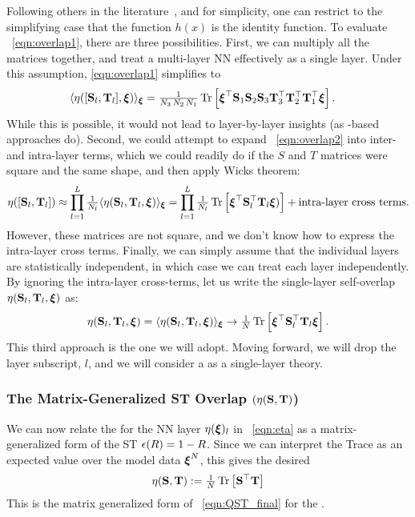 Following others in the literature~\cite{SMG2013_TR}, and for simplicity, one can restrict to the simplifying case that the function $h(x)$ is the identity function.
To evaluate \EQN~\ref{eqn:overlap1}, there are three possibilities.
First, we can multiply all the matrices together, and treat a multi-layer NN effectively as a single layer.
Under this assumption, \EQN \ref{eqn:overlap1} simplifies to
%
\begin{align}
\label{eqn:overlap2}
  \langle\eta([{\mathbf{S}}_l,{\mathbf{T}}_l],\boldsymbol{\xi})\rangle_{\boldsymbol{\xi}} &= \tfrac{1}{N_3 \, N_2 \, N_1} 
  \mbox{}\operatorname{Tr}\left[ \boldsymbol{\xi}^\top 
    \mathbf{S}_1 \mathbf{S}_2 \mathbf{S}_3 
    \mathbf{T}_3^{\top} \mathbf{T}_2^{\top} \mathbf{T}_1^{\top} 
    \boldsymbol{\xi} \right].
\end{align}
While this is possible, it would not lead to layer-by-layer insights (as \HTSR-based approaches do).
%
Second, we could attempt to expand \EQN~\ref{eqn:overlap2} into inter- and intra-layer terms, 
which we could readily do if the $S$ and $T$ matrices were square and the same shape, and then apply Wicks theorem:
\begin{align}
\eta([{\mathbf{S}}_l,{\mathbf{T}}_l])\approx\prod_{l=1}^{L}\tfrac{1}{N_l}\langle\eta({\mathbf{S}}_l,{\mathbf{T}}_l,\boldsymbol{\xi})\rangle_{\boldsymbol{\xi}}=\prod_{l=1}^{L}\tfrac{1}{N_l}\mbox{}\operatorname{Tr}\left[ \boldsymbol{\xi}^{\top} \mathbf{S}^{\top}_{l} \mathbf{T}_{l} \boldsymbol{\xi}) \right] +\text{intra-layer cross terms}.
\end{align}
However, these matrices are not square, and we don't know how to express the intra-layer cross terms.
%
Finally, we can simply assume that the individual layers are statistically independent, in which case we can treat each layer independently.
By ignoring the intra-layer cross-terms, let us write the single-layer self-overlap $\eta({\mathbf{S}}_l,{\mathbf{T}}_l,\boldsymbol{\xi})$ as:
\begin{align}
  \label{eqn:eta}
  \eta({\mathbf{S}}_l,{\mathbf{T}}_l,\boldsymbol{\xi}) =
        \langle\eta({\mathbf{S}}_l,{\mathbf{T}}_l,\boldsymbol{\xi})\rangle_{\boldsymbol{\xi}}\rightarrow \tfrac{1}{N} \mbox{}\operatorname{Tr}\left[ \boldsymbol{\xi}^{\top} \mathbf{S}^{\top}_{l} \mathbf{T}_{l} \boldsymbol{\xi} \right]  .
\end{align}
This third approach is the one we will adopt.
Moving forward, we will drop the layer subscript, $l$, and we will consider a \SETOL as a single-layer theory.


\subsubsection{The Matrix-Generalized ST Overlap $(\eta({\mathbf{S}},{\mathbf{T}})$)}

We can now relate the \SelfOverlap for the NN layer $\eta(\boldsymbol{\xi})_{l}$ in \EQN~\ref{eqn:eta}
as a matrix-generalized form of the ST \EffectivePotential $\epsilon(R)=1-R$.
Since we can interpret the Trace as an expected value over the model data $\boldsymbol{\xi}^{N}$, this gives the desired
\begin{align}
  \label{eqn:eta_vec_avg_def}
  \eta({\mathbf{S}},{\mathbf{T}})
  :=\tfrac{1}{N} \mbox{}\operatorname{Tr}\left[\mathbf{S}^{\top}\mathbf{T}\right] 
\end{align}
This is the matrix generalized form of \EQN~\ref{eqn:QST_final} for the \LayerQuality.

